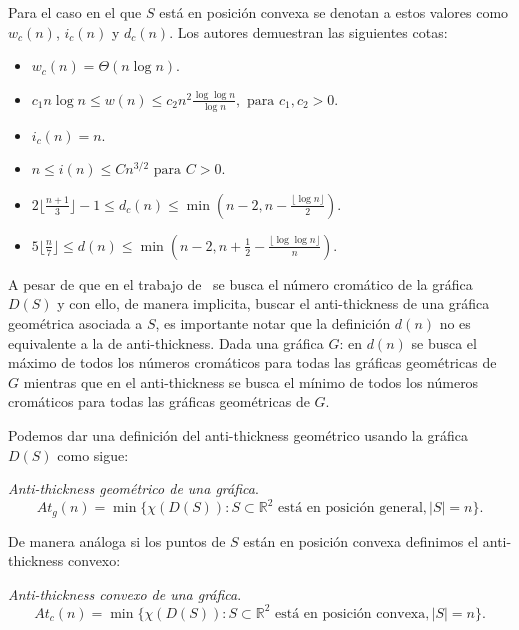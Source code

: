 Para el caso en el que $S$ está en posición convexa se denotan a estos valores como
$w_c(n)$, $i_c(n)$ y $d_c(n)$. Los autores demuestran las siguientes cotas:
\begin{itemize}
  \item $w_c(n) = \Theta(n\log n)$.
  \item $c_1n\log n \leq w(n) \leq c_2 n^2 \frac{\log\log n}{\log n}, \text{ para } c_1,c_2 > 0$.
  \item $i_c(n) = n$.
  \item $n \leq i(n) \leq Cn^{3/2} \text{ para } C > 0$.
  \item $2\lfloor \frac{n+1}{3}\rfloor -1 \leq d_c(n) \leq \min\left( n-2, n - \frac{\lfloor{\log n}\rfloor}{2}\right)$.
  \item $5\lfloor \frac{n}{7}\rfloor \leq d(n) \leq \min\left(n-2,n+\frac{1}{2}- \frac{\lfloor{\log \log n}\rfloor}{n}\right)$.
\end{itemize}

A pesar de que en el trabajo de~\cite{Araujo2005} se busca el número cromático
de la gráfica $D(S)$ y con ello, de manera implicita, buscar el anti-thickness de una gráfica
geométrica asociada a $S$, es importante notar que la definición $d(n)$ no es
equivalente a la de anti-thickness. Dada una gráfica $G$: en $d(n)$ se busca el máximo de todos los
números cromáticos para todas las gráficas geométricas de $G$
mientras que en el anti-thickness se busca el mínimo de todos los números cromáticos para todas
las gráficas geométricas de $G$.

Podemos dar una definición del anti-thickness geométrico usando la gráfica $D(S)$
como sigue:
\begin{definition}{\emph{Anti-thickness geométrico de una gráfica}.}
  \[At_g(n) = \min\{\chi(D(S)): S\subset \mathbb{R}^2 \text{ está en posición general}, |S|=n\}.\]
\end{definition}

De manera análoga si los puntos de $S$ están en posición convexa definimos el
anti-thickness convexo:

\begin{definition}{\emph{Anti-thickness convexo de una gráfica}.}
  \[At_c(n) = \min\{\chi(D(S)): S\subset \mathbb{R}^2 \text{ está en posición convexa}, |S|=n\}.\]
\end{definition}

